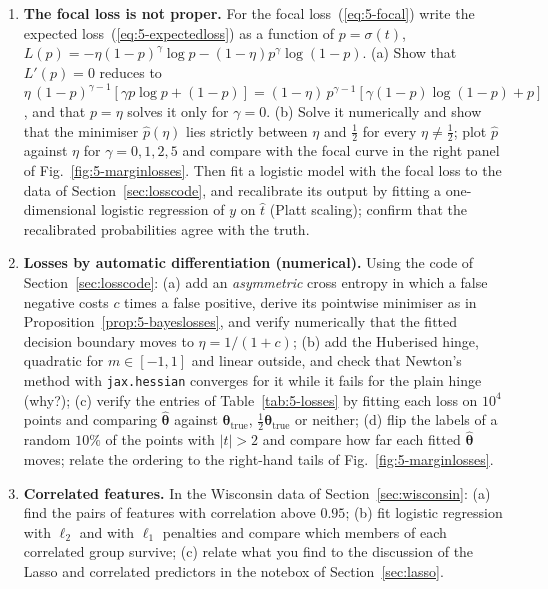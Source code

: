 \begin{enumerate}
\item \textbf{The focal loss is not proper.}
  For the focal loss~(\ref{eq:5-focal}) write the expected
  loss~(\ref{eq:5-expectedloss}) as a function of $p=\sigma(t)$,
  $L(p)=-\eta(1-p)^{\gamma}\log p-(1-\eta)p^{\gamma}\log(1-p)$.
  (a) Show that $L'(p)=0$ reduces to
      $\eta\,(1-p)^{\gamma-1}\left[\gamma p\log p+(1-p)\right]
       =(1-\eta)\,p^{\gamma-1}\left[\gamma(1-p)\log(1-p)+p\right]$,
      and that $p=\eta$ solves it only for $\gamma=0$.
  (b) Solve it numerically and show that the minimiser $\hat p(\eta)$ lies
      strictly between $\eta$ and $\tfrac12$ for every $\eta\neq\tfrac12$;
      plot $\hat p$ against $\eta$ for $\gamma=0,1,2,5$ and compare with the
      focal curve in the right panel of Fig.~\ref{fig:5-marginlosses}.  Then fit a logistic model with the focal loss to the data
  of Section~\ref{sec:losscode}, and recalibrate its output by fitting a
  one-dimensional logistic regression of $y$ on $\hat t$ (Platt scaling);
  confirm that the recalibrated probabilities agree with the truth.

\item \textbf{Losses by automatic differentiation (numerical).}
  Using the code of Section~\ref{sec:losscode}:
  (a) add an \emph{asymmetric} cross entropy in which a false negative costs
      $c$ times a false positive, derive its pointwise minimiser as in
      Proposition~\ref{prop:5-bayeslosses}, and verify numerically that the
      fitted decision boundary moves to $\eta=1/(1+c)$;
  (b) add the Huberised hinge, quadratic for $m\in[-1,1]$ and linear
      outside, and check that Newton's method with \texttt{jax.hessian}
      converges for it while it fails for the plain hinge (why?);
  (c) verify the entries of Table~\ref{tab:5-losses} by fitting each loss on
      $10^{4}$ points and comparing $\hat{\bm{\theta}}$ against
      $\bm{\theta}_{\mathrm{true}}$, $\tfrac12\bm{\theta}_{\mathrm{true}}$
      or neither;
  (d) flip the labels of a random $10\%$ of the points with $|t|>2$ and
      compare how far each fitted $\hat{\bm{\theta}}$ moves; relate the
      ordering to the right-hand tails of Fig.~\ref{fig:5-marginlosses}.

\item \textbf{Correlated features.}
  In the Wisconsin data of Section~\ref{sec:wisconsin}:
  (a) find the pairs of features with correlation above $0.95$;
  (b) fit logistic regression with $\ell_2$ and with $\ell_1$ penalties and
      compare which members of each correlated group survive;
  (c) relate what you find to the discussion of the Lasso and correlated
      predictors in the notebox of Section~\ref{sec:lasso}.

\end{enumerate}

